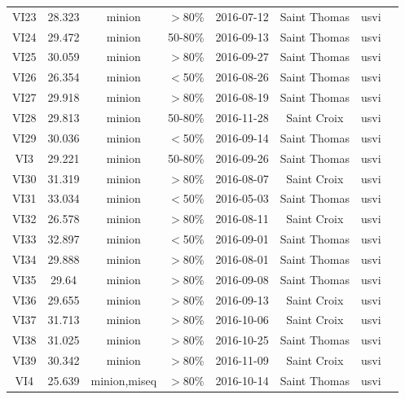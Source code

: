 \documentclass[11pt,oneside,letterpaper]{article}
\begin{document}
\begin{table}
\begin{center}
\begin{tabular}{|c|c|c|c|c|c|c|c|}
   VI23 &   28.323 &        minion &            $>$80\% &      2016-07-12 &  Saint Thomas &    usvi \\
   VI24 &   29.472 &        minion &          50-80\% &      2016-09-13 &  Saint Thomas &    usvi \\
   VI25 &   30.059 &        minion &            $>$80\% &      2016-09-27 &  Saint Thomas &    usvi \\
   VI26 &   26.354 &        minion &            $<$50\% &      2016-08-26 &  Saint Thomas &    usvi \\
   VI27 &   29.918 &        minion &            $>$80\% &      2016-08-19 &  Saint Thomas &    usvi \\
   VI28 &   29.813 &        minion &          50-80\% &      2016-11-28 &   Saint Croix &    usvi \\
   VI29 &   30.036 &        minion &            $<$50\% &      2016-09-14 &  Saint Thomas &    usvi \\
    VI3 &   29.221 &        minion &          50-80\% &      2016-09-26 &  Saint Thomas &    usvi \\
   VI30 &   31.319 &        minion &            $>$80\% &      2016-08-07 &   Saint Croix &    usvi \\
   VI31 &   33.034 &        minion &            $<$50\% &      2016-05-03 &  Saint Thomas &    usvi \\
   VI32 &   26.578 &        minion &            $>$80\% &      2016-08-11 &   Saint Croix &    usvi \\
   VI33 &   32.897 &        minion &            $<$50\% &      2016-09-01 &  Saint Thomas &    usvi \\
   VI34 &   29.888 &        minion &            $>$80\% &      2016-08-01 &  Saint Thomas &    usvi \\
   VI35 &    29.64 &        minion &            $>$80\% &      2016-09-08 &  Saint Thomas &    usvi \\
   VI36 &   29.655 &        minion &            $>$80\% &      2016-09-13 &   Saint Croix &    usvi \\
   VI37 &   31.713 &        minion &            $>$80\% &      2016-10-06 &   Saint Croix &    usvi \\
   VI38 &   31.025 &        minion &            $>$80\% &      2016-10-25 &  Saint Thomas &    usvi \\
   VI39 &   30.342 &        minion &            $>$80\% &      2016-11-09 &   Saint Croix &    usvi \\
    VI4 &   25.639 &  minion,miseq &            $>$80\% &      2016-10-14 &  Saint Thomas &    usvi \\

\end{tabular}
\end{center}
\end{table}
\end{document}
